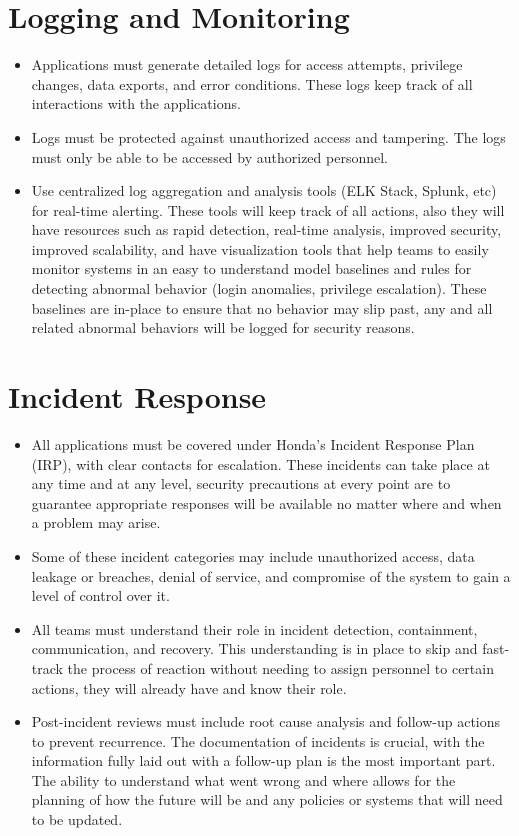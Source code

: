 \section{Logging and Monitoring}
\begin{itemize}
    \item Applications must generate detailed logs for access attempts, privilege changes, data exports, and error conditions. These logs keep track of all interactions with the applications. 
    \item  Logs must be protected against unauthorized access and tampering. The logs must only be able to be accessed by authorized personnel.
    \item Use centralized log aggregation and analysis tools (ELK Stack, Splunk, etc) for real-time alerting. These tools will keep track of all actions, also they will have resources such as rapid detection, real-time analysis, improved security, improved scalability, and have visualization tools that help teams to easily monitor systems in an easy to understand model
    \itemEstablish baselines and rules for detecting abnormal behavior (login anomalies, privilege escalation). These baselines are in-place to ensure that no behavior may slip past, any and all related abnormal behaviors will be logged for security reasons.
\end{itemize}
\section{Incident Response}
\begin{itemize}
    \item All applications must be covered under Honda’s Incident Response Plan (IRP), with clear contacts for escalation. These incidents can take place at any time and at any level, security precautions at every point are to guarantee appropriate responses will be available no matter where and when a problem may arise.
    \item Some of these incident categories may include unauthorized access, data leakage or breaches, denial of service, and compromise of the system to gain a level of control over it.
    \item All teams must understand their role in incident detection, containment, communication, and recovery. This understanding is in place to skip and fast-track the process of reaction without needing to assign personnel to certain actions, they will already have and know their role.
    \item Post-incident reviews must include root cause analysis and follow-up actions to prevent recurrence. The documentation of incidents is crucial, with the information fully laid out with a follow-up plan is the most important part. The ability to understand what went wrong and where allows for the planning of how the future will be and any policies or systems that will need to be updated. 
\end{itemize}
